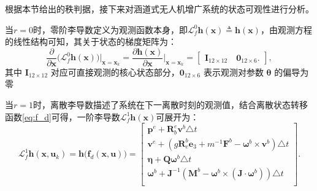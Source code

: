 根据本节给出的秩判据，接下来对涵道式无人机增广系统的状态可观性进行分析。

当$r=0$时，零阶李导数定义为观测函数本身，即$\mathcal{L}_f^0 \boldsymbol{h}(\boldsymbol{x}) \triangleq \boldsymbol{h}(\boldsymbol{x})$，由观测方程的线性结构可知，其关于状态的梯度矩阵为：
\begin{equation}
    \frac{\partial}{\partial \boldsymbol{x}}\big( \mathcal{L}_f^0 \boldsymbol{h}(\boldsymbol{x}) \big)\Big|_{\boldsymbol{x}=\boldsymbol{x}_k} = \frac{\partial \boldsymbol{h}(\boldsymbol{x})}{\partial \boldsymbol{x}}\Big|_{\boldsymbol{x}=\boldsymbol{x}_k} = 
    \begin{bmatrix}
        \boldsymbol{I}_{12 \times 12} \quad \boldsymbol{0}_{12 \times 6}.
    \end{bmatrix},
    \label{eq:L0fh}
\end{equation}
其中 $\boldsymbol{I}_{12\times12}$ 对应可直接观测的核心状态部分，$\boldsymbol{0}_{12\times 6}$ 表示观测对参数 $\boldsymbol{\theta}$ 的偏导为零

当$r=1$时，离散李导数描述了系统在下一离散时刻的观测值，结合离散状态转移函数\ref{eq:f_d}可得，一阶李导数$\mathcal{L}_f^1 \boldsymbol{h}(\boldsymbol{x})$可展开为：
\begin{equation}
    \mathcal{L}_f^1 \boldsymbol{h}(\boldsymbol{x}, \boldsymbol{u}_k) = 
    \boldsymbol{h}\big(\boldsymbol{f}_d(\boldsymbol{x},\boldsymbol{u})\big) =
    \begin{bmatrix}
        \boldsymbol{p}^e + \boldsymbol{R}_b^e \boldsymbol{v}^b \triangle t \\
        \boldsymbol{v}^e + (g\boldsymbol{R}_e^b \boldsymbol{e}_{3} +  m^{-1}\boldsymbol{F}^b - \boldsymbol{\omega}^b \times \boldsymbol{v}^b) \triangle t\\
        \boldsymbol{\eta} + \boldsymbol{Q}\boldsymbol{\omega}^b \triangle t \\
        \boldsymbol{\omega}^b + \boldsymbol{J}^{-1}(\boldsymbol{M}^b - \boldsymbol{\omega}^b\times(\boldsymbol{J}\cdot\boldsymbol{\omega}^b)) \triangle t \\
    \end{bmatrix}.
    \label{eq:Lf1h}
\end{equation}

